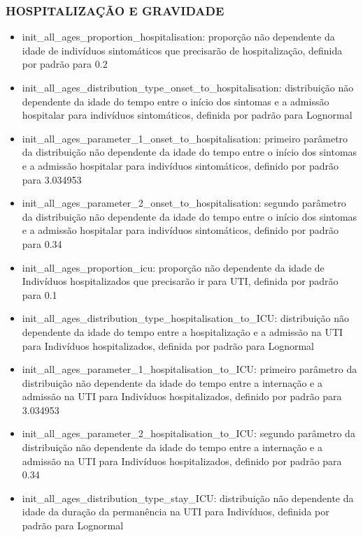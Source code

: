 \subsubsection{HOSPITALIZAÇÃO E GRAVIDADE}

\begin{itemize}
\item {init\_all\_ages\_proportion\_hospitalisation}: proporção não dependente da idade de indivíduos sintomáticos que precisarão de hospitalização, definida por padrão para 0.2
\end{itemize}

\begin{itemize}
\item {init\_all\_ages\_distribution\_type\_onset\_to\_hospitalisation}: distribuição não dependente da idade do tempo entre o início dos sintomas e a admissão hospitalar para indivíduos sintomáticos, definida por padrão para Lognormal
\item {init\_all\_ages\_parameter\_1\_onset\_to\_hospitalisation}: primeiro parâmetro da distribuição não dependente da idade do tempo entre o início dos sintomas e a admissão hospitalar para indivíduos sintomáticos, definido por padrão para 3.034953
\item {init\_all\_ages\_parameter\_2\_onset\_to\_hospitalisation}: segundo parâmetro da distribuição não dependente da idade do tempo entre o início dos sintomas e a admissão hospitalar para indivíduos sintomáticos, definido por padrão para 0.34
\item {init\_all\_ages\_proportion\_icu}: proporção não dependente da idade de Indivíduos hospitalizados que precisarão ir para UTI, definida por padrão para 0.1
\item {init\_all\_ages\_distribution\_type\_hospitalisation\_to\_ICU}: distribuição não dependente da idade do tempo entre a hospitalização e a admissão na UTI para Indivíduos hospitalizados, definida por padrão para Lognormal
\item {init\_all\_ages\_parameter\_1\_hospitalisation\_to\_ICU}: primeiro parâmetro da distribuição não dependente da idade do tempo entre a internação e a admissão na UTI para Indivíduos hospitalizados, definido por padrão para 3.034953
\item {init\_all\_ages\_parameter\_2\_hospitalisation\_to\_ICU}: segundo parâmetro da distribuição não dependente da idade do tempo entre a internação e a admissão na UTI para Indivíduos hospitalizados, definido por padrão para 0.34
\item {init\_all\_ages\_distribution\_type\_stay\_ICU}: distribuição não dependente da idade da duração da permanência na UTI para Indivíduos, definida por padrão para Lognormal

\end{itemize}
